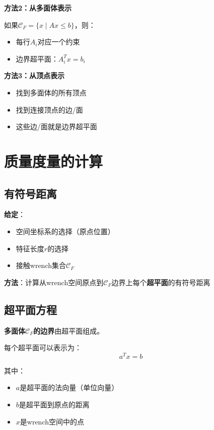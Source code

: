 \documentclass[12pt,a4paper]{article}
\begin{document}
\textbf{方法2：从多面体表示}

如果$\mathcal{C}_F = \{x \mid A x \leq b\}$，则：
\begin{itemize}
\item 每行$A_i$对应一个约束
\item 边界超平面：$A_i^T x = b_i$
\end{itemize}

\textbf{方法3：从顶点表示}

\begin{itemize}
\item 找到多面体的所有顶点
\item 找到连接顶点的边/面
\item 这些边/面就是边界超平面
\end{itemize}

\section{质量度量的计算}

\subsection{有符号距离}

\textbf{给定}：
\begin{itemize}
\item 空间坐标系的选择（原点位置）
\item 特征长度$r$的选择
\item 接触wrench集合$\mathcal{C}_F$
\end{itemize}

\textbf{方法}：计算从wrench空间原点到$\mathcal{C}_F$边界上每个\textbf{超平面}的有符号距离

\subsection{超平面方程}

\textbf{多面体$\mathcal{C}_F$的边界}由超平面组成。

每个超平面可以表示为：
\begin{equation}
a^T x = b
\end{equation}

其中：
\begin{itemize}
\item $a$是超平面的法向量（单位向量）
\item $b$是超平面到原点的距离
\item $x$是wrench空间中的点
\end{itemize}
\end{document}
